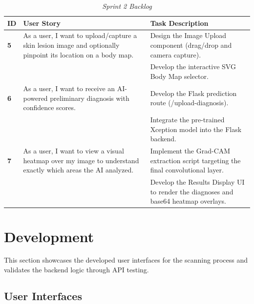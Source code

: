 \begin{table}[H]
	\centering
	\small
	\renewcommand{\arraystretch}{1.2}
	\begin{tabular}{|>{\centering\arraybackslash}p{0.8cm}|>{\raggedright\arraybackslash}p{4.5cm}|>{\raggedright\arraybackslash}p{6.8cm}|}
		\hline
		\rowcolor[HTML]{1F3864}
		{\color{white}\textbf{ID}} & {\color{white}\textbf{User Story}} & {\color{white}\textbf{Task Description}} \\
		\hline
		\textbf{5} & As a user, I want to upload/capture a skin lesion image and optionally pinpoint its location on a body map. & Design the Image Upload component (drag/drop and camera capture). \\
		\cline{3-3}
		& & Develop the interactive SVG Body Map selector. \\
		\hline
		\textbf{6} & As a user, I want to receive an AI-powered preliminary diagnosis with confidence scores. & Develop the Flask prediction route (/upload-diagnosis). \\
		\cline{3-3}
		& & Integrate the pre-trained Xception model into the Flask backend. \\
		\hline
		\textbf{7} & As a user, I want to view a visual heatmap over my image to understand exactly which areas the AI analyzed. & Implement the Grad-CAM extraction script targeting the final convolutional layer. \\
		\cline{3-3}
		& & Develop the Results Display UI to render the diagnoses and base64 heatmap overlays. \\
		\hline
	\end{tabular}
	\caption{\textit{Sprint 2 Backlog}}
	\label{tab:sprint2_backlog}
\end{table}

\section{Development}
This section showcases the developed user interfaces for the scanning process and validates the backend logic through API testing.

\subsection{User Interfaces}

